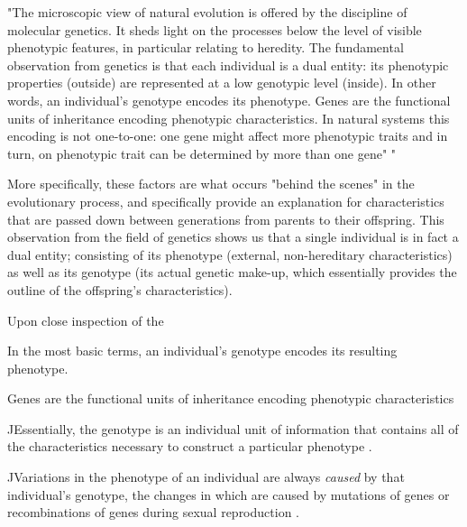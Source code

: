"The microscopic view of natural evolution is offered by the discipline of molecular genetics. It sheds light on the processes below the level of visible phenotypic features, in particular relating to heredity. The fundamental observation from genetics is that each individual is a dual entity: its phenotypic properties (outside) are represented at a low genotypic level (inside). In other words, an individual's genotype encodes its phenotype. Genes are the functional units of inheritance encoding phenotypic characteristics. In natural systems this encoding is not one-to-one: one gene might affect more phenotypic traits and in turn, on phenotypic trait can be determined by more than one gene" \cite{EibenSmith2003}"

More specifically, these factors are what occurs "behind the scenes" in the evolutionary process, and specifically provide an explanation for characteristics that are passed down between generations from parents to their offspring. 
This observation from the field of genetics shows us that a single individual is in fact a dual entity; consisting of its phenotype (external, non-hereditary characteristics) as well as its genotype (its actual genetic make-up, which essentially provides the outline of the offspring's characteristics).

Upon close inspection of the 

In the most basic terms, an individual's genotype encodes its resulting phenotype.

Genes are the functional units of inheritance encoding phenotypic characteristics


^^
Essentially, the genotype is an individual unit of information that contains all of the characteristics necessary to construct a particular phenotype \cite{EibenSmith2003}.


^^
Variations in the phenotype of an individual are always \textit{caused} by that individual's genotype, the changes in which are caused by mutations of genes or recombinations of genes during sexual reproduction \cite{EibenSmith2003}.

